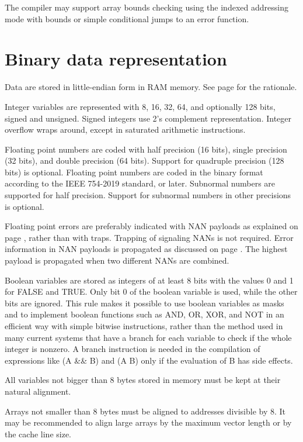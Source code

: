 \documentclass[forwardcom.tex]{subfiles}
\begin{document}
\vv
The compiler may support array bounds checking using the indexed addressing mode with bounds or simple conditional jumps to an error function. 

\section{Binary data representation} \label{binaryDataRepresentation}
Data are stored in little-endian form in RAM memory. See page \pageref{endianness} for the rationale. 
\vv

Integer variables are represented with 8, 16, 32, 64, and optionally 128 bits, signed and unsigned. Signed integers use 2's complement representation. Integer overflow wraps around, except in saturated arithmetic instructions. 
\vv

Floating point numbers are coded with half precision (16 bits), single precision (32 bits), and double precision (64 bits). Support for quadruple precision (128 bits) is optional. Floating point numbers are coded in the binary format according to the IEEE 754-2019 standard, or later. Subnormal numbers are supported for half precision. Support for subnormal numbers in other precisions is optional.
\vv

Floating point errors are preferably indicated with NAN payloads as explained on page \pageref{FloatingPointErrors}, rather than with traps. Trapping of signaling NANs is not required. Error information in NAN payloads is propagated as discussed on page \pageref{nanPropagation}. The highest payload is propagated when two different NANs are combined.
\vv

\label{booleanRepresentation}
Boolean variables are stored as integers of at least 8 bits with the values 0 and 1 for FALSE and TRUE. Only bit 0 of the boolean variable is used, while the other bits are ignored. This rule makes it possible to use boolean variables as masks and to implement boolean functions such as AND, OR, XOR, and NOT in an efficient way with simple bitwise instructions, rather than the method used in many current systems that have a branch for each variable to check if the whole integer is nonzero. A branch instruction is needed in the compilation of expressions like (A \&\& B) and (A \textbar\textbar{} B) only if the evaluation of B has side effects. 
\vv

All variables not bigger than 8 bytes stored in memory must be kept at their natural alignment.
\vv

Arrays not smaller than 8 bytes must be aligned to addresses divisible by 8. It may be recommended to align large arrays by the maximum vector length or by the cache line size. 
\vv
\end{document}
